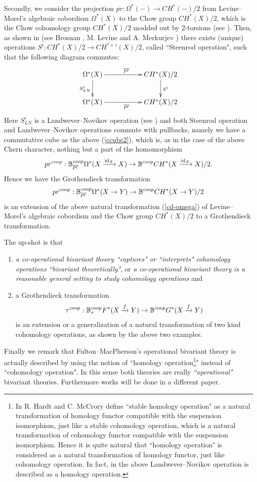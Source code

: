 \documentclass[a4paper]{amsart}
\begin{document}
Secondly, we consider the projection $\overline{pr}: \Omega^*(-) \to CH^*(-)/2$ from Levine--Morel's algebraic cobordism $\Omega^*(X)$ to the Chow group $CH^*(X)/2$, which is the Chow cohomology group $CH^*(X)/2$ modded out by 2-torsions (see \cite{Vishik}). Then, as shown in \cite{Vishik} (see Brosnan \cite{Bros}, M. Levine \cite{Levine} and A. Merkurjev \cite{Merk})  there exists (unique) operations $S^i:CH^*(X)/2 \to CH^{*+i}(X)/2$, called ``Steenrod operation", such that the following diagram commutes:
\begin{equation}\label{cd-omega}
\xymatrix
{\Omega^*(X) \ar[d]_{S^i_{LN}} \ar[rr]^{\overline{pr}} && CH^*(X)/2 \ar[d]^{S^i}\\
\Omega^*(X) \ar[rr]_{\overline{pr}} && CH^*(X)/2
}
\end{equation}
Here $S^i_{LN}$ is a Landwever--Novikov operation (see \cite{LM}) and both Steenrod operation and Landwever--Novikov operations commute with pullbacks, namely we have a commutative cube as the above (\ref{ccube2}), which is, as in the case of the above Chern  character, nothing but a part of the homomorphism
$$pr^{coop}: \mathbb B^{coop}_{\overline{pr}}\Omega^*(X \xrightarrow {\operatorname{id}_X} X) \to \mathbb B^{coop}CH^*(X \xrightarrow {\operatorname{id}_X} X)/2.$$
Hence we have the Grothendieck transformation
$$pr^{coop}: \mathbb B^{coop}_{\overline{pr}}\Omega^*(X \to Y) \to \mathbb B^{coop}CH^*(X \to Y)/2$$
is an extension of the above natural transformation (\ref{cd-omega}) of Levine--Morel's algebraic cobordism  and the Chow group $CH^*(X)/2$ to a Grothendieck transformation.

The up-shot is that 
\begin{enumerate}
\item \emph{a co-operational bivariant theory ``captures" or ``interprets" cohomology operations ``bivariant theoretically"}, or \emph{a co-operational bivariant theory is a reasonable general setting to study cohomology operations} and 
\item a Grothendieck transformation
$$\tau^{coop}: \mathbb B^{coop}_{\tau}F^*(X \xrightarrow f Y) \to \mathbb B^{coop}G^*(X \xrightarrow f Y)$$
is an extension or a generalization of a natural transformation of two kind cohomology operations, as shown by the above two examples.
\end{enumerate}

Finally we remark that Fulton--MacPherson's operational bivariant theory is actually described by using the notion of ``homology operation\footnote{In \cite[3.1 Definition]{HM} R. Hardt and C. McCrory define ``stable homology operation" as a natural transformation of homology functor compatible with the suspension isomorphism, just like a stable cohomology operation, which is a natural transformation of cohomology functor compatible with the suspension isomorphism. Hence it is quite natural that ``homology operation" is considered as a natural transformation of homology functor, just like cohomology operation. In fact, in \cite[Example 4.1.25]{LM} the above Landwever--Novikov operation is described as a homology operation.}" instead of ``cohomology operation". In this sense both theories are really \emph{``operational"} bivariant theories. Furthermore works will be done in a different paper.
\end{document}
